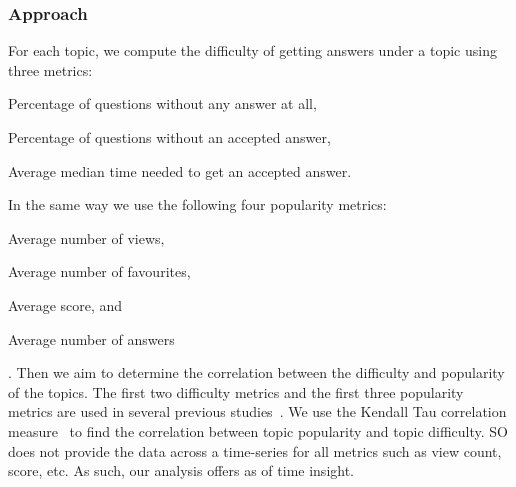 \subsubsection{Approach} For each topic, we compute the difficulty of getting answers under a topic using three metrics: \begin{inparaenum}[(1)] 
\item Percentage of questions without any answer at all,
\item Percentage of questions without an accepted answer,
\item Average median time needed to get an accepted answer.
\end{inparaenum} In the same way we use the following four popularity metrics: \begin{inparaenum}[(1)]
\item Average number of views, \item Average number of favourites, \item Average
score, and \item Average number of answers\end{inparaenum}. Then we aim to determine the correlation between the difficulty and
popularity of the topics. The first two difficulty metrics and the first three popularity metrics are used in several previous studies~\cite{bagherzadeh2019going, abdellatif2020challenges, ahmed2018concurrency}. We use the Kendall Tau correlation measure~\cite{Kendall-TauMetric-Biometrica1938} to
find the correlation between topic popularity and topic difficulty. SO does not
provide the data across a time-series for all metrics such as view count, score, etc. As such, our analysis offers as of time insight. 

